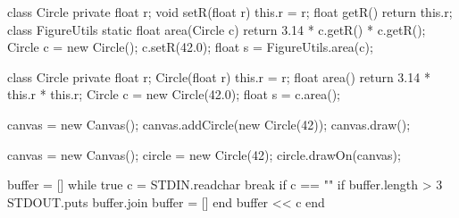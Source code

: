 \documentclass{article}
\begin{document}
\begin{lnSnippet}
class Circle {
  private float r;
  void setR(float r) { this.r = r; }
  float getR() { return this.r; }
}
class FigureUtils {
  static float area(Circle c) {
    return 3.14 * c.getR() * c.getR();
  }
}
Circle c = new Circle();
c.setR(42.0);
float s = FigureUtils.area(c);
\end{lnSnippet}
\begin{lnSnippet}
class Circle {
  private float r;
  Circle(float r) { this.r = r; }
  float area() {
    return 3.14 * this.r * this.r;
  }
}
Circle c = new Circle(42.0);
float s = c.area();
\end{lnSnippet}

\begin{lnSnippet}
canvas = new Canvas();
canvas.addCircle(new Circle(42));
canvas.draw();
\end{lnSnippet}
\begin{lnSnippet}
canvas = new Canvas();
circle = new Circle(42);
circle.drawOn(canvas);
\end{lnSnippet}


\begin{lnSnippet}
buffer = []
while true
  c = STDIN.readchar
  break if c == "\n"
  if buffer.length > 3
    STDOUT.puts buffer.join
    buffer = []
  end
  buffer << c
end
\end{lnSnippet}
\end{document}
